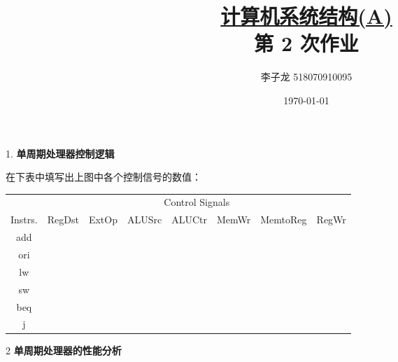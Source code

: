 \documentclass[12pt,a4paper]{article}
\newenvironment{problems}{\begin{list}{}{\renewcommand{\makelabel}[1]{\textbf{##1}.\hfil}}}{\end{list}}
\begin{document}
\title{\normalsize \underline{计算机系统结构(A)}\\\LARGE 第 2 次作业}
\author{李子龙 518070910095}
\date{\today}
\maketitle

\begin{problems}
    \item[1.] \textbf{单周期处理器控制逻辑}
    



    在下表中填写出上图中各个控制信号的数值：
    
    \begin{tabular}{c|ccccccc}
        & \multicolumn{7}{c}{Control Signals}\\
        Instrs. & \sffamily RegDst &\sffamily ExtOp &\sffamily ALUSrc &\sffamily ALUCtr &\sffamily MemWr &\sffamily MemtoReg &\sffamily RegWr \\ 
        \hline
        \ttfamily add & & & & & & & \\ 
        \ttfamily ori & & & & & & & \\
        \ttfamily lw  & & & & & & & \\ 
        \ttfamily sw  & & & & & & & \\ 
        \ttfamily beq & & & & & & & \\
        \ttfamily j   & & & & & & & \\
        \hline
    \end{tabular}


    \item[2] \textbf{单周期处理器的性能分析}
    


\end{problems}
\end{document}

